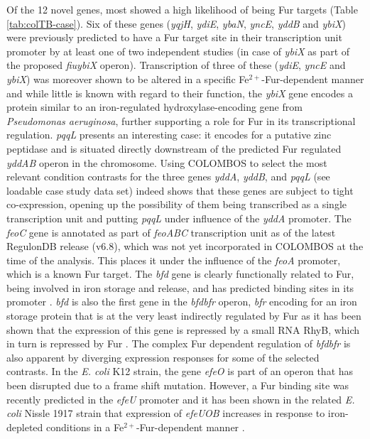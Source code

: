 Of the 12 novel genes, most showed a high likelihood of being Fur targets 
(Table \ref{tab:colTB-case}). Six of these genes (\textit{yqjH}, \textit{ydiE}, 
\textit{ybaN}, \textit{yncE}, \textit{yddB} and \textit{ybiX}) were previously 
predicted to have a Fur target site in their transcription unit promoter by at 
least one of two independent studies \cite{Panina2001, Meysman2011} (in case of 
\textit{ybiX} as part of the proposed \textit{fiu}\textunderscore\textit{ybiX} 
operon). Transcription of three of these (\textit{ydiE}, \textit{yncE} and 
\textit{ybiX}) was moreover shown to be altered in a specific 
Fe$^{2+}$-Fur-dependent manner \cite{McHugh2003} and while little is known with 
regard to their function, the \textit{ybiX} gene encodes a protein similar to 
an iron-regulated hydroxylase-encoding gene from {\it Pseudomonas aeruginosa}, 
further supporting a role for Fur in its transcriptional regulation. 
\textit{pqqL} presents an interesting case: it encodes for a putative zinc 
peptidase and is situated directly downstream of the predicted 
Fur regulated \textit{yddAB} operon in the chromosome. 
%
Using COLOMBOS to select the most relevant 
condition contrasts for the three genes \textit{yddA}, \textit{yddB}, and 
\textit{pqqL} (see loadable case study data set) indeed shows that these genes 
are subject to tight co-expression, opening up the possibility of them being 
transcribed as a single transcription unit and putting \textit{pqqL} under 
influence of the \textit{yddA} promoter. The \textit{feoC} gene is annotated as 
part of \textit{feoABC} transcription unit as of the latest RegulonDB release 
(v6.8), which was not yet incorporated in COLOMBOS at the time of the analysis. 
This places it under the influence of the \textit{feoA} promoter, which is a 
known Fur target. The \textit{bfd} gene is clearly functionally related to Fur, 
being involved in iron storage and release, and has predicted binding sites in 
its promoter \cite{Chen2007}. \textit{bfd} is also the first gene in the 
\textit{bfd}\textunderscore\textit{bfr} operon, \textit{bfr} encoding for an 
iron storage protein that is at the very least indirectly regulated by Fur as 
it has been shown that the expression of this gene is repressed by a small RNA 
RhyB, which in turn is repressed by Fur \cite{Masse2002}. The complex Fur 
dependent regulation of \textit{bfd}\textunderscore\textit{bfr} is also 
apparent by diverging expression responses for some of the selected contrasts. 
In the {\it E. coli} K12 strain, the gene \textit{efeO} is part of an operon 
that has been disrupted due to a frame shift mutation. However, a Fur binding 
site was recently predicted in the \textit{efeU} promoter \cite{Meysman2011} 
and it has been shown in the related {\it E. coli} Nissle 1917 strain that 
expression of \textit{efeUOB} increases in response to iron-depleted conditions 
in a Fe$^{2+}$-Fur-dependent manner \cite{Grosse2006}.

